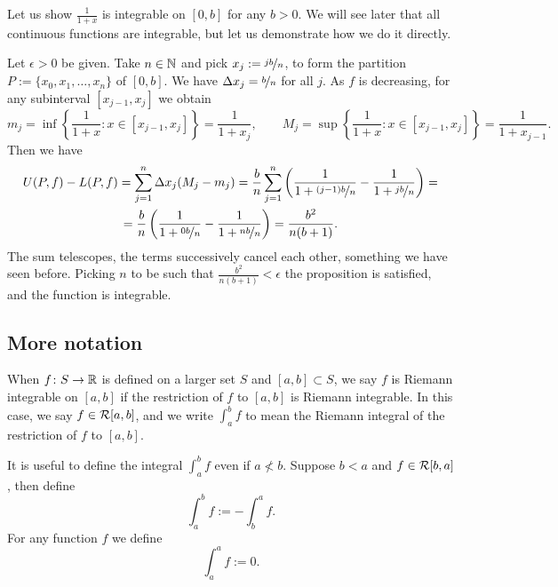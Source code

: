 \begin{example}
Let us show $\frac{1}{1+x}$ is integrable on $[0,b]$ for any $b > 0$.
We will see later that all continuous functions are integrable, but let us
demonstrate how we do it directly.

Let $\epsilon > 0$ be given.  Take $n \in {\mathbb{N}}$ and
pick $x_j := \nicefrac{jb}{n}$, to form the 
partition $P := \{ x_0,x_1,\ldots,x_n \}$ of $[0,b]$.
We have $\Delta x_j = \nicefrac{b}{n}$ for all $j$.  
As $f$ is decreasing, for any subinterval $[x_{j-1},x_j]$ we obtain
\begin{equation*}
m_j = \inf \left\{ \frac{1}{1+x} : x \in [x_{j-1},x_j] \right\} = \frac{1}{1+x_j} ,
\qquad
M_j = \sup \left\{ \frac{1}{1+x} : x \in [x_{j-1},x_j] \right\} =
\frac{1}{1+x_{j-1}} .
\end{equation*}
Then we have
\begin{multline*}
U(P,f)-L(P,f)
=
\sum_{j=1}^n
\Delta x_j
(M_j-m_j)
=
\frac{b}{n}
\sum_{j=1}^n 
\left( \frac{1}{1+\nicefrac{(j-1)b}{n}} - \frac{1}{1+\nicefrac{jb}{n}} \right) 
=
\\
=
\frac{b}{n}
\left( \frac{1}{1+\nicefrac{0b}{n}} - \frac{1}{1+\nicefrac{nb}{n}} \right) 
=
\frac{b^2}{n(b+1)} .
\end{multline*}
The sum telescopes, the terms successively cancel each other, something
we have seen before.
Picking $n$ to be such that
$\frac{b^2}{n(b+1)} < \epsilon$ the proposition is satisfied, and the
function is integrable.
\end{example}

\subsection{More notation}

When $f \colon S \to {\mathbb{R}}$ is defined on a larger set $S$ and
$[a,b] \subset S$,
we say $f$ is Riemann integrable on $[a,b]$ if the restriction of $f$
to $[a,b]$ is Riemann integrable. 
In this case,
we say $f \in {\mathcal{R}}[a,b]$,
and
we write $\int_a^b f$ to mean the Riemann integral
of the restriction of $f$ to $[a,b]$.

It is useful to define the integral $\int_a^b f$ even if
$a \not< b$.  Suppose $b < a$ and $f \in {\mathcal{R}}[b,a]$,
then define
\begin{equation*}
\int_a^b f := - \int_b^a f .
\end{equation*}
For any function $f$ we define
\begin{equation*}
\int_a^a f := 0 .
\end{equation*}

